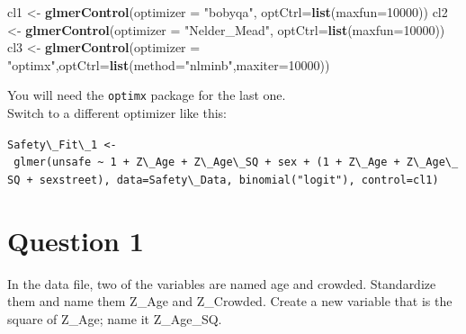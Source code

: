 \documentclass[]{article}
\newenvironment{Shaded}{\begin{snugshade}}{\end{snugshade}}
\newcommand{\KeywordTok}[1]{\textcolor[rgb]{0.13,0.29,0.53}{\textbf{#1}}}
\newcommand{\DataTypeTok}[1]{\textcolor[rgb]{0.13,0.29,0.53}{#1}}
\newcommand{\DecValTok}[1]{\textcolor[rgb]{0.00,0.00,0.81}{#1}}
\newcommand{\StringTok}[1]{\textcolor[rgb]{0.31,0.60,0.02}{#1}}
\newcommand{\OperatorTok}[1]{\textcolor[rgb]{0.81,0.36,0.00}{\textbf{#1}}}
\newcommand{\NormalTok}[1]{#1}
\begin{document}
\begin{Shaded}
\begin{Highlighting}[]
\NormalTok{cl1 <-}\StringTok{ }\KeywordTok{glmerControl}\NormalTok{(}\DataTypeTok{optimizer =} \StringTok{"bobyqa"}\NormalTok{, }\DataTypeTok{optCtrl=}\KeywordTok{list}\NormalTok{(}\DataTypeTok{maxfun=}\DecValTok{10000}\NormalTok{))}
\NormalTok{cl2 <-}\StringTok{ }\KeywordTok{glmerControl}\NormalTok{(}\DataTypeTok{optimizer =} \StringTok{"Nelder_Mead"}\NormalTok{, }\DataTypeTok{optCtrl=}\KeywordTok{list}\NormalTok{(}\DataTypeTok{maxfun=}\DecValTok{10000}\NormalTok{))}
\NormalTok{cl3 <-}\StringTok{ }\KeywordTok{glmerControl}\NormalTok{(}\DataTypeTok{optimizer =} \StringTok{"optimx"}\NormalTok{,}\DataTypeTok{optCtrl=}\KeywordTok{list}\NormalTok{(}\DataTypeTok{method=}\StringTok{"nlminb"}\NormalTok{,}\DataTypeTok{maxiter=}\DecValTok{10000}\NormalTok{))}
\end{Highlighting}
\end{Shaded}

You will need the \texttt{optimx} package for the last one.\\
Switch to a different optimizer like this:

\texttt{Safety\textbackslash{}\_Fit\textbackslash{}\_1\ \textless{}-\ glmer(unsafe\ \textasciitilde{}\ 1\ +\ Z\textbackslash{}\_Age\ +\ Z\textbackslash{}\_Age\textbackslash{}\_SQ\ +\ sex\ +\ (1\ +\ Z\textbackslash{}\_Age\ +\ Z\textbackslash{}\_Age\textbackslash{}\_SQ\ +\ sex\textbar{}street),\ data=Safety\textbackslash{}\_Data,\ binomial("logit"),\ control=cl1)}

\section{Question 1}\label{question-1}

In the data file, two of the variables are named age and crowded.
Standardize them and name them Z\_Age and Z\_Crowded. Create a new
variable that is the square of Z\_Age; name it Z\_Age\_SQ.

\begin{Shaded}
\end{Shaded}
\end{document}

